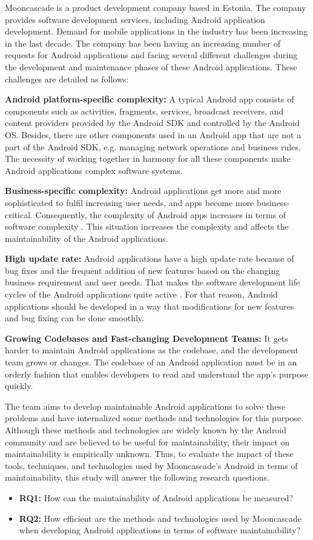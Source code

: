 Mooncascade is a product development company based in Estonia. The company provides software development services, including Android application development. Demand for mobile applications in the industry has been increasing in the last decade. The company has been having an increasing number of requests for Android applications and facing several different challenges during the development and maintenance phases of these Android applications. These challenges are detailed as follows:

\noindent\textbf{Android platform-specific complexity:} A typical Android app consists of components such as activities, fragments, services, broadcast receivers, and content providers provided by the Android SDK and controlled by the Android OS. Besides, there are other components used in an Android app that are not a part of the Android SDK, e.g. managing network operations and business rules. The necessity of working together in harmony for all these components make Android applications complex software systems.

\noindent\textbf{Business-specific complexity:} Android applications get more and more sophisticated to fulfil increasing user needs, and apps become more business-critical. Consequently, the complexity of Android apps increases in terms of software complexity \cite{2}. This situation increases the complexity and affects the maintainability of the Android applications.

\noindent\textbf{High update rate:} Android applications have a high update rate because of bug fixes and the frequent addition of new features based on the changing business requirement and user needs. That makes the software development life cycles of the Android applications quite active \cite{3}. For that reason, Android applications should be developed in a way that modifications for new features and bug fixing can be done smoothly.

\noindent\textbf{Growing Codebases and Fast-changing Development Teams:} It gets harder to maintain Android applications as the codebase, and the development team grows or changes. The codebase of an Android application must be in an orderly fashion that enables developers to read and understand the app's purpose quickly.

The team aims to develop maintainable Android applications to solve these problems and have internalized some methods and technologies for this purpose. Although these methods and technologies are widely known by the Android community and are believed to be useful for maintainability, their impact on maintainability is empirically unknown. Thus, to evaluate the impact of these tools, techniques, and technologies used by Mooncascade's Android in terms of maintainability, this study will answer the following research questions. 

\begin{itemize}
\item \noindent\textbf{RQ1:} How can the maintainability of Android applications be measured?
\item \noindent\textbf{RQ2:} How efficient are the methods and technologies used by Mooncascade when developing Android applications in terms of software maintainability?
\end{itemize}
